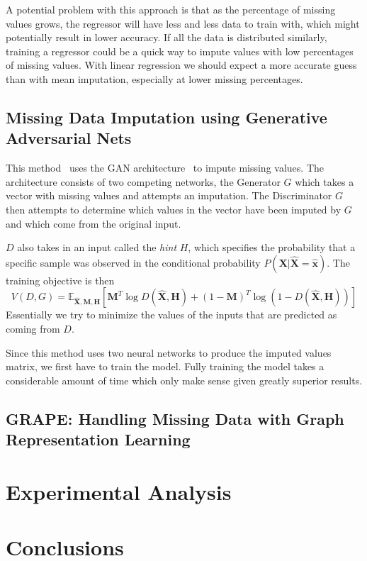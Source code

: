 \documentclass[12pt]{article}
\begin{document}
A potential problem with this approach is that as the percentage of 
missing values grows, the regressor will have less and less data to 
train with, which might potentially result in lower accuracy.
If all the data is distributed similarly, training a regressor
could be a quick way to impute values with low percentages of 
missing values.
With linear regression we should expect a more accurate guess than 
with mean imputation, especially at lower missing percentages.

\subsection{Missing Data Imputation using Generative Adversarial Nets}
This method~\cite{yoon2018gain} uses the GAN architecture~\cite{goodfellow2014generative} 
to impute missing values.
The architecture consists of two competing networks, the Generator $G$
which takes a vector with missing values and attempts an imputation.
The Discriminator $G$ then attempts to determine which values in the 
vector have been imputed by $G$ and which come from the original input.

$D$ also takes in an input called the \emph{hint} $H$, which specifies
the probability that a specific sample was observed in the conditional
probability $P(\boldsymbol{X}|\hat{\boldsymbol{X}} = \hat{\boldsymbol{x}})$.
The training objective is then 
\[V(D, G) = \mathbb{E}_{\hat{\boldsymbol{X}}, \boldsymbol{M}, \boldsymbol{H}}
[\boldsymbol{M}^T\log D(\hat{\boldsymbol{X}},\boldsymbol{H}) + (1-\boldsymbol{M})^T
\log(1-D(\hat{\boldsymbol{X}}, \boldsymbol{H}))]\]
Essentially we try to minimize the values of the inputs that are predicted as coming
from $D$.

Since this method uses two neural networks to produce the imputed values matrix,
we first have to train the model.
Fully training the model takes a considerable amount of time which only make 
sense given greatly superior results.

\subsection{GRAPE: Handling Missing Data with Graph Representation Learning}
\section{Experimental Analysis}
\section{Conclusions}

\printbibliography
\end{document}
